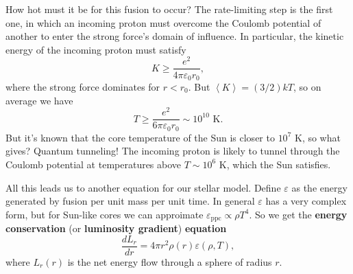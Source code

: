 \documentclass[../a062main.tex]{subfiles}
\begin{document}
How hot must it be for this fusion to occur?
The rate-limiting step is the first one, in which an incoming proton must overcome the Coulomb potential of another to enter the strong force's domain of influence.
In particular, the kinetic energy of the incoming proton must satisfy
\[ K \geq \frac{e^2}{4\pi \varepsilon_0 r_0}, \]
where the strong force dominates for $r < r_0$.
But $\left< K \right> = (3/2) kT$, so on average we have
\[ T \geq \frac{e^2}{6\pi \varepsilon_0 r_0} \sim 10^{10} \textrm{ K}. \]
But it's known that the core temperature of the Sun is closer to $10^{7} \textrm{ K}$, so what gives?
Quantum tunneling!
The incoming proton is likely to tunnel through the Coulomb potential at temperatures above $T \sim 10^{6} \text{ K}$, which the Sun satisfies.

All this leads us to another equation for our stellar model.
Define $\varepsilon$ as the energy generated by fusion per unit mass per unit time.
In general $\varepsilon$ has a very complex form, but for Sun-like cores we can approimate $\varepsilon_\textrm{ppc} \propto \rho T^{4}$.
So we get the \textbf{energy conservation} (or \textbf{luminosity gradient}) \textbf{equation}
\[ \boxed{\frac{dL_r}{dr} = 4\pi r^2 \rho(r) \varepsilon(\rho, T)}, \]
where $L_r(r)$ is the net energy flow through a sphere of radius $r$.
\end{document}
